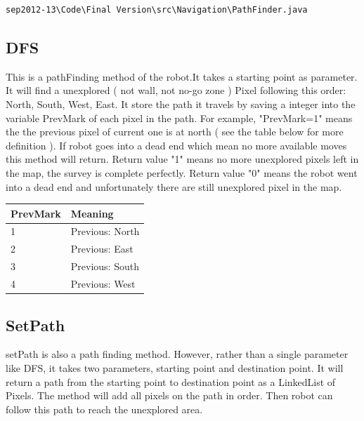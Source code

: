 \documentclass[11pt, a4paper]{report}
\begin{document}
\begin{lstlisting} 
sep2012-13\Code\Final Version\src\Navigation\PathFinder.java
\end{lstlisting} 





\subsection{DFS}
This is a pathFinding method of the robot.It takes a starting point as parameter. It will find a unexplored ( not wall, not no-go zone ) Pixel following this order: North, South, West, East. It store the path it travels by saving a integer into the variable PrevMark of each pixel in the path. For example, "PrevMark=1" means the the previous pixel of current one is at north ( see the table below for more definition ). If robot goes into a dead end which mean no more available moves this method will return. Return value "1" means no more unexplored pixels left in the map, the survey is complete perfectly. Return value "0" means the robot went into a dead end and unfortunately there are still unexplored pixel in the map.

\begin{center}
\begin{tabular}{| l | l | }
\hline
PrevMark		&	Meaning\\ \hline

1 		&	Previous: North\\ \hline
2 		&	Previous: East\\ \hline
3 		&	Previous: South\\ \hline
4		&	Previous: West\\ \hline

\end{tabular}
\end{center}

\subsection{SetPath}
setPath is also a path finding method. However, rather than a single parameter like DFS, it takes two parameters, starting point and destination point. It will return a path from the starting point to destination point as a LinkedList of Pixels. The method will add all pixels on the path in order. Then robot can follow this path to reach the unexplored area.
\end{document}
